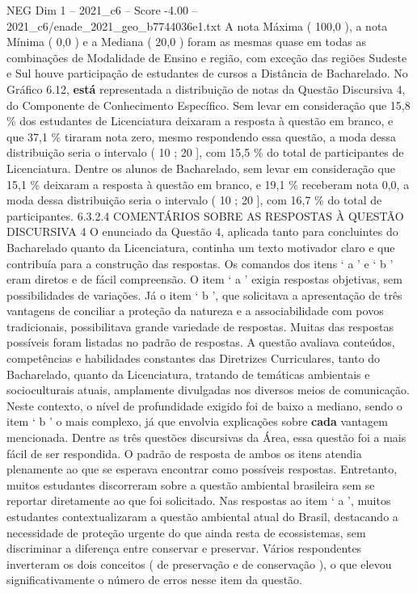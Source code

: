 \begin{textsample}{NEG Dim 1 – 2021\_c6 – Score -4.00 – 2021\_c6/enade\_2021\_geo\_b7744036e1.txt}
A nota Máxima ( 100,0 ), a nota Mínima ( 0,0 ) e a Mediana ( 20,0 ) foram as mesmas quase em todas as combinações de Modalidade de Ensino e região, com exceção das regiões Sudeste e Sul houve participação de estudantes de cursos a Distância de Bacharelado.
No Gráfico 6.12, \textbf{está} representada a distribuição de notas da Questão Discursiva 4, do Componente de Conhecimento Específico.
Sem levar em consideração que 15,8 \% dos estudantes de Licenciatura deixaram a resposta à questão em branco, e que 37,1 \% tiraram nota zero, mesmo respondendo essa questão, a moda dessa distribuição seria o intervalo ( 10 ; 20 ], com 15,5 \% do total de participantes de Licenciatura.
Dentre os alunos de Bacharelado, sem levar em consideração que 15,1 \% deixaram a resposta à questão em branco, e 19,1 \% receberam nota 0,0, a moda dessa distribuição seria o intervalo ( 10 ; 20 ], com 16,7 \% do total de participantes. 6.3.2.4 COMENTÁRIOS SOBRE AS RESPOSTAS À QUESTÃO DISCURSIVA 4 O enunciado da Questão 4, aplicada tanto para concluintes do Bacharelado quanto da Licenciatura, continha um texto motivador claro e que contribuía para a construção das respostas.
Os comandos dos itens ‘ a ’ e ‘ b ’ eram diretos e de fácil compreensão.
O item ‘ a ’ exigia respostas objetivas, sem possibilidades de variações.
Já o item ‘ b ’, que solicitava a apresentação de três vantagens de conciliar a proteção da natureza e a associabilidade com povos tradicionais, possibilitava grande variedade de respostas.
Muitas das respostas possíveis foram listadas no padrão de respostas.
A questão avaliava conteúdos, competências e habilidades constantes das Diretrizes Curriculares, tanto do Bacharelado, quanto da Licenciatura, tratando de temáticas ambientais e socioculturais atuais, amplamente divulgadas nos diversos meios de comunicação.
Neste contexto, o nível de profundidade exigido foi de baixo a mediano, sendo o item ‘ b ’ o mais complexo, já que envolvia explicações sobre \textbf{cada} vantagem mencionada.
Dentre as três questões discursivas da Área, essa questão foi a mais fácil de ser respondida.
O padrão de resposta de ambos os itens atendia plenamente ao que se esperava encontrar como possíveis respostas.
Entretanto, muitos estudantes discorreram sobre a questão ambiental brasileira sem se reportar diretamente ao que foi solicitado.
Nas respostas ao item ‘ a ’, muitos estudantes contextualizaram a questão ambiental atual do Brasil, destacando a necessidade de proteção urgente do que ainda resta de ecossistemas, sem discriminar a diferença entre conservar e preservar.
Vários respondentes inverteram os dois conceitos ( de preservação e de conservação ), o que elevou significativamente o número de erros nesse item da questão.

\end{textsample}
